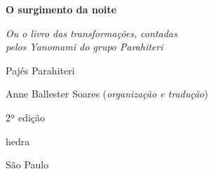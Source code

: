 




\begingroup\thispagestyle{empty}\vspace*{.05\textheight} 

              {\formular
              \huge
              \noindent
              \textbf{O surgimento da noite}\\
              
              \vspace{-0.5cm}
              
              }

              \vspace{0.5cm}

              \noindent{}\textit{Ou o livro das transformações, contadas\\pelos Yanomami do  grupo Parahiteri}

              \vspace{1cm}
              
              {\formular\Large
              \noindent{}Pajés Parahiteri
              }

              \vfill              

              {\small
              \noindent{}Anne Ballester Soares (\textit{organização e tradução})
              }

              \vspace{0.5cm}

              {\small\noindent{}2ª edição}

              \vfill
              
              \newfontfamily{}
              {\noindent\fontsize{30}{40}\selectfont \timesnewroman hedra}

              {\selectfont\small\noindent São Paulo \quad\the\year}

\endgroup
\pagebreak
